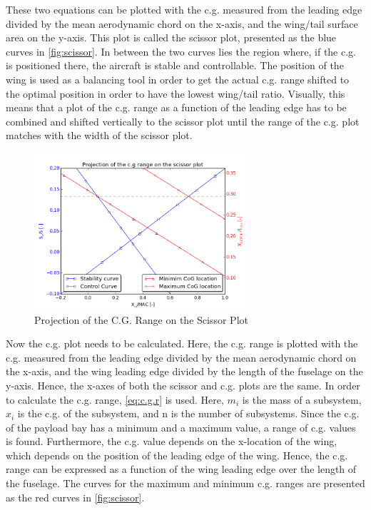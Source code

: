 These two equations can be plotted with the c.g. measured from the leading edge divided by the mean aerodynamic chord on the x-axis, and the wing/tail surface area on the y-axis. This plot is called the scissor plot, presented as the blue curves in \autoref{fig:scissor}. In between the two curves lies the region where, if the c.g. is positioned there, the aircraft is stable and controllable. The position of the wing is used as a balancing tool in order to get the actual c.g. range shifted to the optimal position in order to have the lowest wing/tail ratio. Visually, this means that a plot of the c.g. range as a function of the leading edge has to be combined and shifted vertically to the scissor plot until the range of the c.g. plot matches with the width of the scissor plot.

\begin{figure}[htb]
    \centering
    \includegraphics[width=0.7\textwidth]{StabilityandControl/Figures/Scissor}
    \caption{Projection of the C.G. Range on the Scissor Plot}
    \label{fig:scissor}
\end{figure}


Now the c.g. plot needs to be calculated. Here, the c.g. range is plotted with the c.g. measured from the leading edge divided by the mean aerodynamic chord on the x-axis, and the wing leading edge divided by the length of the fuselage on the y-axis. Hence, the x-axes of both the scissor and c.g. plots are the same. In order to calculate the c.g. range, \autoref{eq:c.g.r} is used. Here, $m_i$ is the mass of a subsystem, $x_i$ is the c.g. of the subsystem, and n is the number of subsystems. Since the c.g. of the payload bay has a minimum and a maximum value, a range of c.g. values is found. Furthermore, the c.g. value depends on the x-location of the wing, which depends on the position of the leading edge of the wing. Hence, the c.g. range can be expressed as a function of the wing leading edge over the length of the fuselage. The curves for the maximum and minimum c.g. ranges are presented as the red curves in \autoref{fig:scissor}.

